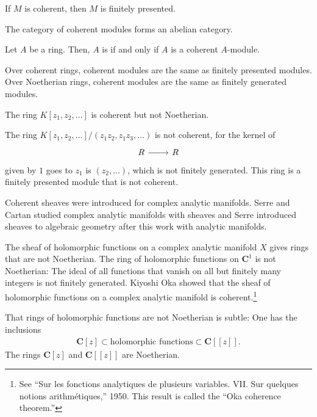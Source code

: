 \documentclass [11 pt, oneside] {article}
\begin{document}
\begin{remark}
	If $M$ is coherent, then $M$ is finitely presented.
\end{remark}

The category of coherent modules forms an abelian category.

 \begin{definition}[ ]\label{}\text{}
Let $A$ be a ring. Then, $A$ is  if and only if $A$ is a coherent $A$-module.
\end{definition}

Over coherent rings, coherent modules are the same as finitely presented modules. Over Noetherian rings, coherent modules are the same as finitely generated modules.

\begin{example}[ ]\label{}\text{}
The ring $K[z_1,z_2,\hdots]$ is coherent but not Noetherian. 

The ring $K[z_1,z_2,\hdots]/(z_1z_2,z_1z_3,\hdots)$ is not coherent, for the kernel of
\[
\begin{tikzcd}
R\ar[r]&R
\end{tikzcd}
\]
given by $1$ goes to $z_1$ is $(z_2,\hdots)$, which is not finitely generated. This ring is a finitely presented module that is not coherent.
\end{example}

Coherent sheaves were introduced for complex analytic manifolds. Serre and Cartan studied complex analytic manifolds with sheaves and Serre introduced sheaves to algebraic geometry after this work with analytic manifolds. 

The sheaf of holomorphic functions on a complex analytic manifold $X$ gives rings that are not Noetherian. The ring of holomorphic functions on $\mathbf{C}^1$ is not Noetherian: The ideal of all functions that vanish on all but finitely many integers is not finitely generated. Kiyoshi Oka showed that the sheaf of holomorphic functions on a complex analytic manifold is coherent.\footnote{See ``Sur les fonctions analytiques de plusieurs variables. VII. Sur quelques notions arithmétiques,'' 1950. This result is called the ``Oka coherence theorem.''}

That rings of holomorphic functions are not Noetherian is subtle: One has the inclusions
\begin{align*}
	\mathbf{C}[z] \subset \textrm{holomorphic functions} \subset \mathbf{C}[\![z]\!].
\end{align*}
The rings $\mathbf{C}[z]$ and $\mathbf{C}[\![z]\!]$ are Noetherian.
\end{document}
